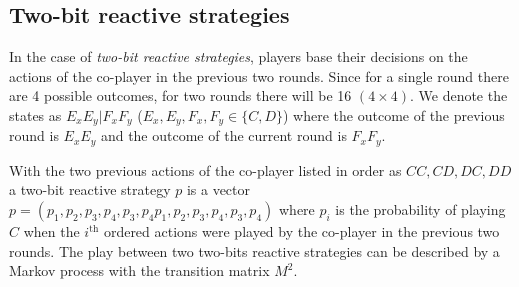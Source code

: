 \documentclass{article}
\theoremstyle{definition}
\begin{document}
\subsection{Two-bit reactive strategies}

In the case of \textit{two-bit reactive strategies}, players base their
decisions on the actions of the co-player in the previous two rounds. Since for
a single round there are 4 possible outcomes, for two rounds there will be 16
\((4 \times 4)\). We denote the states as \(E_x E_y | F_x F_y\) (\(E_x, E_y,
F_x, F_y \in \{C, D\}\)) where the outcome of the previous round is \(E_x E_y\)
and the outcome of the current round is \(F_x F_y\).

With the two previous actions of the co-player listed in order as \(CC, CD, DC,
DD\) a two-bit reactive strategy \(p\) is a vector \(p = (p_1, p_2, p_3, p_4,
p_3, p_4 p_1, p_2, p_3, p_4, p_3, p_4)\) where \(p_i\) is the probability of
playing \(C\) when the \(i^{\text{th}}\) ordered actions were played by the
co-player in the previous two rounds. The play between two two-bits reactive
strategies can be described by a Markov process with the transition matrix
\(M^2\).
\end{document}
